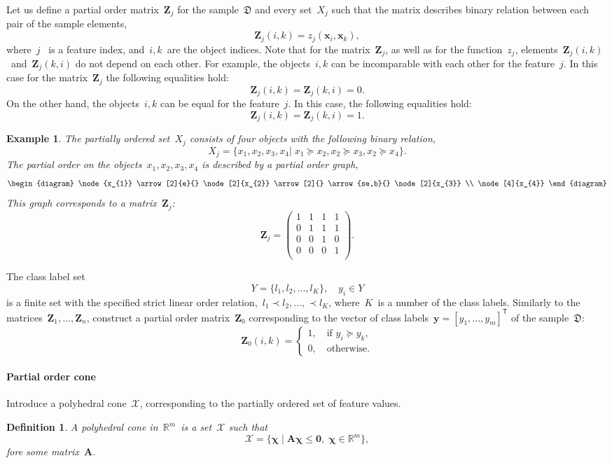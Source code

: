 \documentclass[12pt,preprint]{elsarticle}
\newcommand{\bx}{\mathbf{x}}
\newcommand{\by}{\mathbf{y}}
\newcommand{\bZ}{\mathbf{Z}}
\newcommand{\bA}{\mathbf{A}}
\newcommand{\bchi}{\boldsymbol{\chi}}
\newcommand{\T}{^{\mathsf{T}}}
\newtheorem{Ex}{Example}
\newtheorem{Def}{Definition}
\begin{document}
Let us define a partial order matrix~$\bZ_j$ for the sample~$\mathfrak{D}$ and every set~$X_j$ such that the matrix describes binary relation between each pair of the sample elements,
\[
\bZ_j(i,k) = z_j(\bx_i,\bx_k),
\]
where~$j$~ is a feature index, and~$i,k$~are the object indices.
Note that for the matrix~$\bZ_j$, as well as for the function~$z_j$, elements~$\bZ_j(i,k)$~and~$\bZ_j(k,i)$ do not depend on each other. For example, the objects~$i,k$ can be incomparable with each other for the feature~$j$. In this case for the matrix~$\bZ_j$ the following equalities hold:
\[
\bZ_j(i,k)=\bZ_j(k,i)=0.
\]
On the other hand, the objects~$i,k$ can be equal for the feature~$j$. In this case, the following equalities hold:
\[
\bZ_j(i,k)=\bZ_j(k,i)=1.
\]
\begin{Ex}
The partially ordered set~$X_j$ consists of four objects with the following binary relation,
\[
X_j=\{x_{1},x_{2},x_{3},x_{4}|\;x_{1}\succeq x_{2}, x_{2}\succeq x_{3}, x_{2}\succeq x_{4}\}.
\]
The partial order on the objects~$x_{1},x_{2},x_{3},x_{4}$ is described by a partial order graph,
\[
\begin{diagram}
\node{x_{1}} \arrow[2]{e}{}
\node[2]{x_{2}} \arrow[2]{}
\arrow{se,b}{}
\node[2]{x_{3}} \\
\node[4]{x_{4}}
\end{diagram}
\]
This graph corresponds to a matrix~$\bZ_j$:
\[
\bZ_j=
\begin{pmatrix}
1 & 1 & 1 & 1 \\
0 & 1 & 1 & 1 \\
0 & 0 & 1 & 0 \\
0 & 0 & 0 & 1 \\
\end{pmatrix}.
\]
\label{ex1}
\end{Ex}
The class label set
\begin{equation}
Y=\{l_1,l_2,...,l_K\},\quad y_i\in Y
\label{yValues}
\end{equation}
is a finite set with the specified strict linear order relation,~$l_1\prec l_2,...,\prec l_K$, where~$K$~is a number of the class labels. Similarly to the matrices~$\bZ_1,...,\bZ_n$, construct a partial order matrix~$\bZ_0$ corresponding to the vector of class labels~$\by=[y_1,...,y_m]\T$ of the sample~$\mathfrak{D}$:
\[
\bZ_0(i,k) =
\begin{cases}
1,\quad\text{if } y_i\succeq y_k, \\
0,\quad\text{otherwise}.
\end{cases}
\]
\paragraph{Partial order cone}
Introduce a polyhedral cone~$\mathcal{X}$, corresponding to the partially ordered set of feature values.
\begin{Def}
A polyhedral cone in~$\mathbb{R}^m$~is a set~$\mathcal{X}$ such that
\[
\mathcal{X}=\{\bchi\;|\;\bA\bchi\leq \mathbf{0},\;\bchi\in\mathbb{R}^m\},
\]
fore some matrix~$\bA$.
\end{Def}
\end{document}
